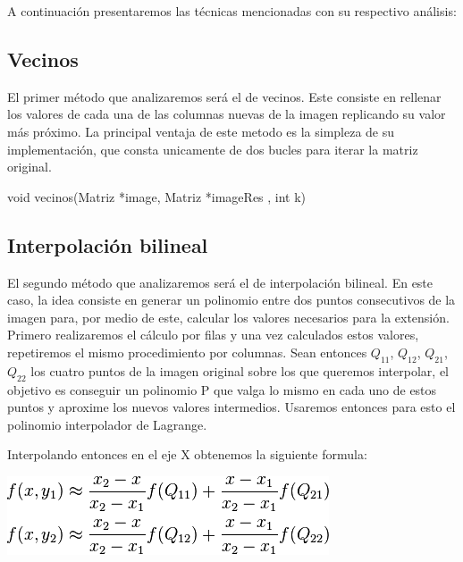 A continuación presentaremos las técnicas mencionadas con su respectivo análisis:

\subsection{Vecinos}
El primer método que analizaremos será el de vecinos. Este consiste en rellenar los valores de cada una de las columnas
nuevas de la imagen replicando su valor más próximo. La principal ventaja de este metodo es la simpleza de su implementación, que consta unicamente de dos bucles para iterar la matriz original.

\begin{algorithm}
\begin{algorithmic}[1]\parskip=1mm
\caption{void vecinos(Matriz *image, Matriz *imageRes , int k)}
    \ENDFOR
\ENDFOR
\end{algorithmic}
\end{algorithm}

\subsection{Interpolación bilineal}
El segundo método que analizaremos será el de interpolación bilineal. En este caso, la idea consiste en generar un polinomio entre
dos puntos consecutivos de la imagen para, por medio de este, calcular los valores necesarios para la extensión. \\
Primero realizaremos el cálculo por filas y una vez calculados estos valores, repetiremos el mismo procedimiento por columnas.
Sean entonces $Q_{11}$, $Q_{12}$, $Q_{21}$, $Q_{22}$ los cuatro puntos de la imagen original sobre los que queremos interpolar, el objetivo es conseguir un polinomio P que valga lo mismo en cada uno de estos puntos y aproxime los nuevos valores intermedios. Usaremos entonces para esto el polinomio interpolador de Lagrange.

Interpolando entonces en el eje X obtenemos la siguiente formula:

\includegraphics[scale=0.75]{imagenes/bilinealX.png}\\

